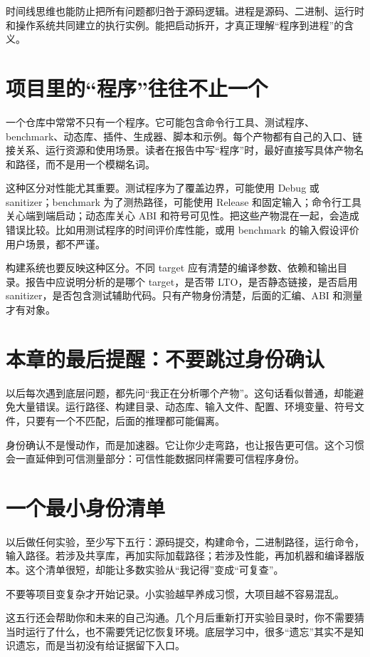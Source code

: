时间线思维也能防止把所有问题都归咎于源码逻辑。进程是源码、二进制、运行时和操作系统共同建立的执行实例。能把启动拆开，才真正理解“程序到进程”的含义。

\section{项目里的“程序”往往不止一个}

一个仓库中常常不只有一个程序。它可能包含命令行工具、测试程序、benchmark、动态库、插件、生成器、脚本和示例。每个产物都有自己的入口、链接关系、运行资源和使用场景。读者在报告中写“程序”时，最好直接写具体产物名和路径，而不是用一个模糊名词。

这种区分对性能尤其重要。测试程序为了覆盖边界，可能使用 Debug 或 sanitizer；benchmark 为了测热路径，可能使用 Release 和固定输入；命令行工具关心端到端启动；动态库关心 ABI 和符号可见性。把这些产物混在一起，会造成错误比较。比如用测试程序的时间评价库性能，或用 benchmark 的输入假设评价用户场景，都不严谨。

构建系统也要反映这种区分。不同 target 应有清楚的编译参数、依赖和输出目录。报告中应说明分析的是哪个 target，是否带 LTO，是否静态链接，是否启用 sanitizer，是否包含测试辅助代码。只有产物身份清楚，后面的汇编、ABI 和测量才有对象。

\section{本章的最后提醒：不要跳过身份确认}

以后每次遇到底层问题，都先问“我正在分析哪个产物”。这句话看似普通，却能避免大量错误。运行路径、构建目录、动态库、输入文件、配置、环境变量、符号文件，只要有一个不匹配，后面的推理都可能偏离。

身份确认不是慢动作，而是加速器。它让你少走弯路，也让报告更可信。这个习惯会一直延伸到可信测量部分：可信性能数据同样需要可信程序身份。

\section{一个最小身份清单}

以后做任何实验，至少写下五行：源码提交，构建命令，二进制路径，运行命令，输入路径。若涉及共享库，再加实际加载路径；若涉及性能，再加机器和编译器版本。这个清单很短，却能让多数实验从“我记得”变成“可复查”。

不要等项目变复杂才开始记录。小实验越早养成习惯，大项目越不容易混乱。

这五行还会帮助你和未来的自己沟通。几个月后重新打开实验目录时，你不需要猜当时运行了什么，也不需要凭记忆恢复环境。底层学习中，很多“遗忘”其实不是知识遗忘，而是当初没有给证据留下入口。

